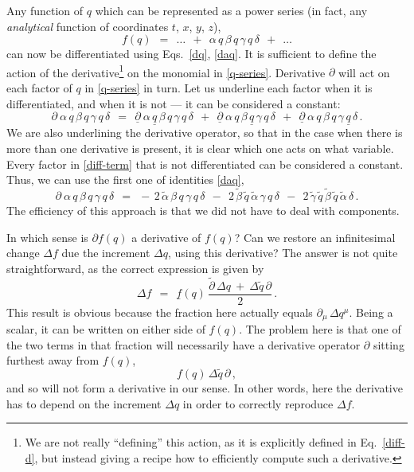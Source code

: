 \documentclass[epsfig,12pt]{article}
\newcommand{\p}{\partial}
\newcommand{\wt}{\widetilde}
\begin{document}
	Any function of $ q $ which can be represented as a power series (in fact, any \emph{analytical} function
	of coordinates $ t $, $ x $, $ y $, $ z $), 
\begin{equation}
\label{q-series}
	f(q)	~~=~~	\dots ~~+~~ \alpha\,q\,\beta\,q\,\gamma\,q\,\delta  ~~+~~ \dots
\end{equation}
	can now be differentiated using Eqs.~\eqref{dq}, \eqref{daq}.
	It is sufficient to define the action of the derivative\footnote{We are not really ``defining'' this action,
	as it is explicitly defined in Eq.~\eqref{diff-d}, but instead giving a recipe how to efficiently compute such a derivative.}
	on the monomial in \eqref{q-series}.
	Derivative $ \p $ will act on each factor of $ q $ in \eqref{q-series} in turn.
	Let us underline each factor when it is differentiated, and when it is not --- it can be considered a constant:
\begin{equation}
\label{diff-term}
	\p~ \alpha\,q\,\beta\,q\,\gamma\,q\,\delta	~~=~~
		\underline \p~ \alpha\,\underline q\,\beta\,q\,\gamma\,q\,\delta  ~~+~~
		\underline \p~ \alpha\,q\,\beta\,\underline q\,\gamma\,q\,\delta  ~~+~~
		\underline \p~ \alpha\,q\,\beta\,q\,\gamma\,\underline q\,\delta\,.
\end{equation}
	We are also underlining the derivative operator, so that in the case when there is more than
	one derivative is present, it is clear which one acts on what variable.
	Every factor in \eqref{diff-term} that is not differentiated can be considered a constant.
	Thus, we can use the first one of identities \eqref{daq},
\[
	\p~ \alpha\,q\,\beta\,q\,\gamma\,q\,\delta	~~=~~
		-\,2\,\wt\alpha\,\beta\,q\,\gamma\,q\,\delta  ~~-~~
		2\, \wt\beta\, \wt q\, \wt\alpha\, \gamma\, q\, \delta  ~~-~~
		2\, \wt\gamma\, \wt q\, \wt\beta\, \wt q\, \wt\alpha\, \delta\,.
\]
	The efficiency of this approach is that we did not have to deal with components.

	In which sense is $ \p f(q) $ a derivative of $ f(q) $?
	Can we restore an infinitesimal change $ \Delta f $ due the increment $ \Delta q $, using this derivative?
	The answer is not quite straightforward, as the correct expression is given by
\begin{equation}
\label{delta-f}
	\Delta f	~~=~~	\underline f(q)\, \frac{ \wt\p\, \Delta q ~+~ \Delta \wt q\, \p } 2\,.
\end{equation}
	This result is obvious because the fraction here actually equals $ \p_\mu\, \Delta q^\mu $.
	Being a scalar, it can be written on either side of $ f(q) $.
	The problem here is that one of the two terms in that fraction will
	necessarily have a derivative operator $ \p $ sitting furthest away from $ f(q) $,
\[
	f(q)\, \Delta \wt q\, \p\,,
\]
	and so will not form a derivative in our sense.
	In other words, here the derivative has to depend on the increment $ \Delta q $
	in order to correctly reproduce $ \Delta f $.
\end{document}
